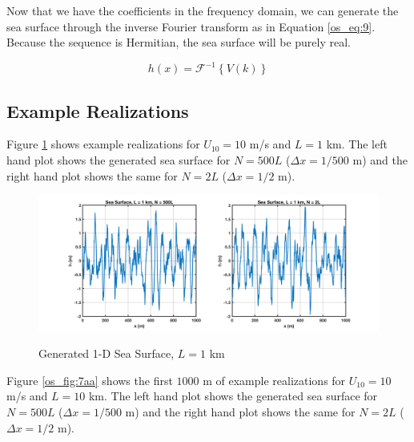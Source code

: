 Now that we have the coefficients in the frequency domain, we can generate the sea surface through the inverse Fourier transform as in Equation \ref{os_eq:9}. Because the sequence is Hermitian, the sea surface will be purely real.

\begin{equation}
  \label{os_eq:9}
  h(x) = \mathcal{F}^{-1}\left\{V(k) \right\}
  \end{equation}
\renewcommand{\baselinestretch}{2} \small\normalsize

\subsection {Example Realizations}
Figure \ref{os_fig:7a} shows example realizations for $U_{10} = 10$ m/s and $L = 1$ km. The left hand plot shows the generated sea surface for $N = 500L$ ($\Delta x = 1/500$ m) and the right hand plot shows the same for $N=2L$ ($\Delta x = 1/2$ m).

\begin{figure}[H]
  \begin{center}
\includegraphics[width=6in]{../media/Ocean_Surface/sea_surface_1000.png}
  \end{center}
  \renewcommand{\baselinestretch}{1} \small\normalsize
  \begin{quote}
    \caption[Generated 1-D Sea Surface, $L = 1$ km]{Generated 1-D Sea Surface, $L = 1$ km\label{os_fig:7a}}
  \end{quote}
\end{figure}
\renewcommand{\baselinestretch}{2} \small\normalsize

Figure \ref{os_fig:7aa} shows the first $1000$ m of example realizations for $U_{10} = 10$ m/s and $L = 10$ km. The left hand plot shows the generated sea surface for $N = 500L$ ($\Delta x = 1/500$ m) and the right hand plot shows the same for $N=2L$ ($\Delta x = 1/2$ m).

